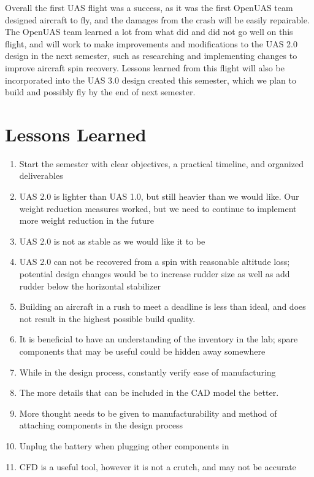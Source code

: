 \documentclass{article}
\begin{document}
Overall the first UAS flight was a success, as it was the first OpenUAS team designed aircraft to fly, and the damages from the crash will be easily repairable. The OpenUAS team learned a lot from what did and did not go well on this flight, and will work to make improvements and modifications to the UAS  2.0 design in the next semester, such as researching and implementing changes to improve aircraft spin recovery. Lessons learned from this flight will also be incorporated into the UAS 3.0 design created this semester, which we plan to build and possibly fly by the end of next semester.


\section{Lessons Learned}

\begin{enumerate}
\item Start the semester with clear objectives, a practical timeline, and organized deliverables
\item UAS 2.0 is lighter than UAS 1.0, but still heavier than we would like. Our weight reduction measures worked, but we need to continue to implement more weight reduction in the future
\item UAS 2.0 is not as stable as we would like it to be
\item UAS 2.0 can not be recovered from a spin with reasonable altitude loss; potential design changes would be to increase rudder size as well as add rudder below the horizontal stabilizer
\item Building an aircraft in a rush to meet a deadline is less than ideal, and does not result in the highest possible build quality.
\item It is beneficial to have an understanding of the inventory in the lab; spare components that may be useful could be hidden away somewhere
\item While in the design process, constantly verify ease of manufacturing
\item The more details that can be included in the CAD model the better. \item More thought needs to be given to manufacturability and method of attaching components in the design process
\item Unplug the battery when plugging other components in
\item CFD is a useful tool, however it is not a crutch, and may not be accurate

\end{enumerate}
\end{document}

